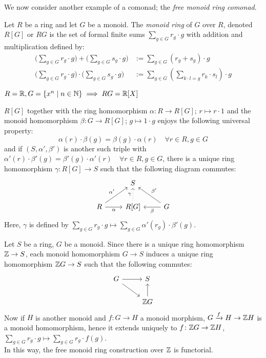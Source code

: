 We now consider another example of a comonad; the \textit{free monoid ring comonad}.
\begin{definition}
    Let $R$ be a ring and let $G$ be a monoid.
    The \textit{monoid ring} of $G$ over $R$, denoted $R[G]$ or $RG$
    is the set of formal finite sums $\sum_{g \in G}r_g \cdot g$
    with addition and multiplication defined by:
    \begin{align*}
        \big(\sum_{g \in G}r_g \cdot g \big) + \big(\sum_{g \in G}s_g \cdot g \big)
        & := \sum_{g \in G}(r_g + s_g)\cdot g \\
        \big(\sum_{g \in G}r_g \cdot g \big) \cdot \big(\sum_{g \in G}s_g \cdot g\big)
        & := \sum_{g \in G}(\sum_{k \cdot l = g} r_k \cdot s_l)\cdot g 
    \end{align*}
\end{definition}
\begin{example}
    $R = \mathbb{R}, G = \{x^n \mid n \in \mathbb{N}\} \implies RG = \mathbb{R}[X]$
\end{example}
\begin{remark} \label{rem: universal property of monoid ring}
$R[G]$ together with the ring homomorphism $\alpha \colon R \to R[G]$;
$r \mapsto r \cdot 1$ and the monoid homomorphism $\beta \colon 
G \to R[G]$; $g \mapsto 1 \cdot g$ 
enjoys the following universal property:
\[
  \alpha(r) \cdot \beta(g) = \beta(g) \cdot \alpha(r)
   \quad \forall r \in R, g \in G
\]
and if $(S,\alpha',\beta')$ is another such triple with
$\alpha'(r) \cdot \beta'(g) = \beta'(g) \cdot \alpha'(r)
   \quad \forall r \in R, g \in G$,
there is a unique ring homomorphism $\gamma \colon R[G] \to S$
such that the following diagram commutes:
\[
    \begin{tikzcd}
        & S \\
        R \arrow[r,"\alpha"'] \arrow[ur,"\alpha'"] 
        & R[G] \arrow[u,"\gamma",dotted] 
        & G \arrow[l,"\beta"] \arrow[ul,"\beta'"']
    \end{tikzcd}
\]
Here, $\gamma$ is defined by 
$\sum_{g \in G}r_g \cdot g \mapsto \sum_{g \in G}\alpha'(r_g) \cdot \beta'(g)$.
\end{remark}
\begin{example} \label{ex: free monoid ring}
    Let $S$ be a ring, $G$ be a monoid.
    Since there is a unique ring homomorphism $\mathbb{Z} \to S$, 
    each monoid homomorphism $G \to S$ induces a unique ring homomorphism
    $\mathbb{Z} G \to S$ such that the following commutes:
    \[
      \begin{tikzcd}
        G \arrow[r] \arrow[rd] 
        &S \\
        & \Z G \arrow[u]
      \end{tikzcd}
    \]
    Now if $H$ is another monoid and $f \colon G \to H$ a monoid morphism,
    $G \xrightarrow{f} H \to \mathbb{Z} H$ is a monoid homomorphism,
    hence it extends uniquely to $f \colon \mathbb{Z} G \to \mathbb{Z} H$,
    $\sum_{g \in G}r_g \cdot g \mapsto \sum_{g \in G}r_g \cdot f(g)$.\\ 
    In this way, the free monoid ring construction over $\mathbb{Z}$ is functorial.
\end{example}

